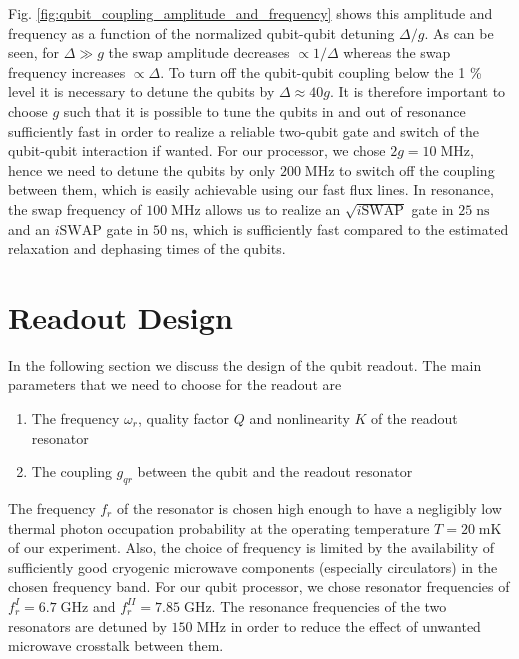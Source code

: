 Fig. \ref{fig:qubit_coupling_amplitude_and_frequency} shows this amplitude and frequency as a function of the normalized qubit-qubit detuning $\Delta/g$. As can be seen, for $\Delta \gg g$ the swap amplitude decreases $\propto 1/\Delta$ whereas the swap frequency increases $\propto \Delta$. To turn off the qubit-qubit coupling below the 1 \% level it is necessary to detune the qubits by $\Delta \approx 40 g$. It is therefore important to choose $g$ such that it is possible to tune the qubits in and out of resonance sufficiently fast in order to realize a reliable two-qubit gate and switch of the qubit-qubit interaction if wanted. For our processor, we chose $2g = 10\;\mathrm{MHz}$, hence we need to detune the qubits by only $200\;\mathrm{MHz}$ to switch off the coupling between them, which is easily achievable using our fast flux lines. In resonance, the swap frequency of $100\;\mathrm{MHz}$ allows us to realize an $\sqrt{i\mathrm{SWAP}}$ gate in $25\;\mathrm{ns}$ and an $i\mathrm{SWAP}$ gate in $50\;\mathrm{ns}$, which is sufficiently fast compared to the estimated relaxation and dephasing times of the qubits.
\section{Readout Design}

In the following section we discuss the design of the qubit readout. The main parameters that we need to choose for the readout are

\begin{enumerate}
\item The frequency $\omega_r$, quality factor $Q$ and nonlinearity $K$ of the readout resonator
\item The coupling $g_{qr}$ between the qubit and the readout resonator
\end{enumerate}

The frequency $f_r$ of the resonator is chosen high enough to have a negligibly low thermal photon occupation probability at the operating temperature $T=20\;\mathrm{mK}$ of our experiment. Also, the choice of frequency is limited by the availability of sufficiently good cryogenic microwave components (especially circulators) in the chosen frequency band. For our qubit processor, we chose resonator frequencies of $f_r^I = 6.7\;\mathrm{GHz}$ and $f_r^{II}=7.85\;\mathrm{GHz}$. The resonance frequencies of the two resonators are detuned by $150\;\mathrm{MHz}$ in order to reduce the effect of unwanted microwave crosstalk between them.

